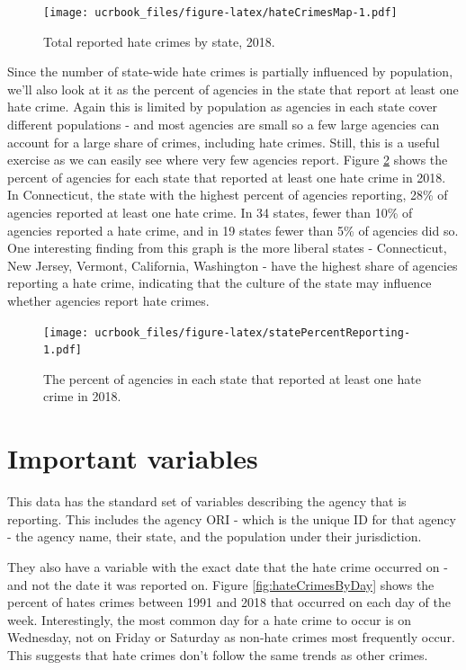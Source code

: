 \documentclass[
  12pt,
  openany]{book}
\begin{document}
\begin{figure}
\centering
\texttt{[image: ucrbook\_files/figure-latex/hateCrimesMap-1.pdf]}
\caption{\label{fig:hateCrimesMap}Total reported hate crimes by state, 2018.}
\end{figure}

Since the number of state-wide hate crimes is partially influenced by population, we'll also look at it as the percent of agencies in the state that report at least one hate crime. Again this is limited by population as agencies in each state cover different populations - and most agencies are small so a few large agencies can account for a large share of crimes, including hate crimes. Still, this is a useful exercise as we can easily see where very few agencies report. Figure \ref{fig:statePercentReporting} shows the percent of agencies for each state that reported at least one hate crime in 2018. In Connecticut, the state with the highest percent of agencies reporting, 28\% of agencies reported at least one hate crime. In 34 states, fewer than 10\% of agencies reported a hate crime, and in 19 states fewer than 5\% of agencies did so. One interesting finding from this graph is the more liberal states - Connecticut, New Jersey, Vermont, California, Washington - have the highest share of agencies reporting a hate crime, indicating that the culture of the state may influence whether agencies report hate crimes.

\begin{figure}
\centering
\texttt{[image: ucrbook\_files/figure-latex/statePercentReporting-1.pdf]}
\caption{\label{fig:statePercentReporting}The percent of agencies in each state that reported at least one hate crime in 2018.}
\end{figure}

\hypertarget{important-variables-1}{%
\section{Important variables}\label{important-variables-1}}

This data has the standard set of variables describing the agency that is reporting. This includes the agency ORI - which is the unique ID for that agency - the agency name, their state, and the population under their jurisdiction.

They also have a variable with the exact date that the hate crime occurred on - and not the date it was reported on. Figure \ref{fig:hateCrimesByDay} shows the percent of hates crimes between 1991 and 2018 that occurred on each day of the week. Interestingly, the most common day for a hate crime to occur is on Wednesday, not on Friday or Saturday as non-hate crimes most frequently occur. This suggests that hate crimes don't follow the same trends as other crimes.
\end{document}
